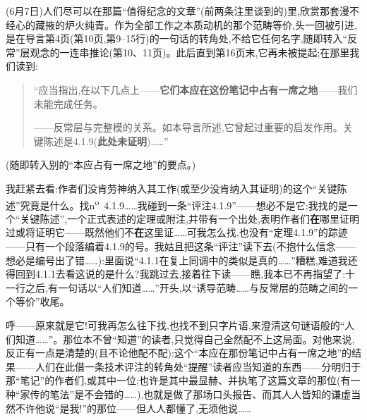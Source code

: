 (6月7日)人们尽可以在那篇“值得纪念的文章”(前两条注里谈到的)里,欣赏那套漫不经心的藏掖的炉火纯青。作为全部工作之本质动机的那个范畴等价,头一回被引进,是在导言第4页(第10页,第9--15行)的一句话的转角处,不给它任何名字,随即转入“反常”层观念的一连串推论(第10、11页)。此后直到第16页末,它再未被提起;在那里我们读到:

\begin{quote}
“应当指出,在以下几点上——\textbf{它们本应在这份笔记中占有一席之地}——我们未能完成任务。

——反常层与完整模的关系。如本导言所述,它曾起过重要的启发作用。关键陈述是4.1.9(\textbf{此处未证明})……”
\end{quote}

(随即转入别的“本应占有一席之地”的要点。)

我赶紧去看:作者们没肯劳神纳入其工作(或至少没肯纳入其证明)的这个“关键陈述”究竟是什么。找n\textsuperscript{o}~4.1.9……我碰到一条“评注4.1.9”——想必不是它;我找的是一个“关键陈述”,一个正式表述的定理或附注,并带有一个出处,表明作者们\textbf{在}哪里证明过或将证明它——既然他们不\textbf{在}这里证……可我怎么找,也没有“定理4.1.9”的踪迹——只有一个段落编着4.1.9的号。我姑且把这条“评注”读下去(不抱什么信念\dmark{}——想必是编号出了错……):里面说“4.1.1在复上同调中的类似是真的……”糟糕,难道我还得回到4.1.1去看这说的是什么?我跳过去,接着往下读——瞧,我本已不再指望了:十一行之后,有一句话以“人们知道……”开头,以“诱导范畴……与反常层的范畴之间的一个等价”收尾。

呼——原来就是它!可我再怎么往下找,也找不到只字片语,来澄清这句谜语般的“人们知道……”。那位本不曾“知道”的读者,只觉得自己全然配不上这局面。对他来说,反正有一点是清楚的(且不论他配不配):这个“本应在那份笔记中占有一席之地”的结果——人们在此借一条技术评注的转角处“提醒”读者应当知道的东西——分明归于那“笔记”的作者们,或其中一位;也许是其中最显赫、并执笔了这篇文章的那位(有一种“家传的笔法”是不会错的……),也就是做了那场口头报告、而其人人皆知的谦虚当然不许他说“是我!”的那位——但人人都懂了,无须他说……

